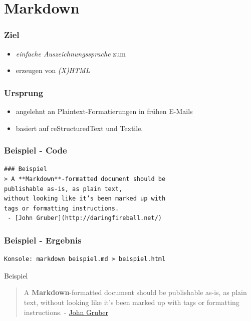 \section{Markdown}

\begin{frame}\frametitle{Ziel}

\begin{itemize}
\item
  \emph{einfache Auszeichnungssprache} zum
\item
  erzeugen von \emph{(X)HTML}
\end{itemize}

\end{frame}

\begin{frame}\frametitle{Ursprung}

\begin{itemize}
\item
  angelehnt an Plaintext-Formatierungen in frühen E-Mails
\item
  basiert auf reStructuredText und Textile.
\end{itemize}

\end{frame}

\begin{frame}[fragile]\frametitle{Beispiel - Code}

\begin{verbatim}
### Beispiel
> A **Markdown**-formatted document should be
publishable as-is, as plain text, 
without looking like it’s been marked up with 
tags or formatting instructions.
 - [John Gruber](http://daringfireball.net/)
\end{verbatim}

\end{frame}

\begin{frame}[fragile]\frametitle{Beispiel - Ergebnis}

\begin{verbatim}
Konsole: markdown beispiel.md > beispiel.html
\end{verbatim}

\begin{block}{Beispiel}

\begin{quote}
A \textbf{Markdown}-formatted document should be publishable as-is, as
plain text, without looking like it's been marked up with tags or
formatting instructions. - \href{http://daringfireball.net/}{John
Gruber}
\end{quote}

\end{block}

\end{frame}

